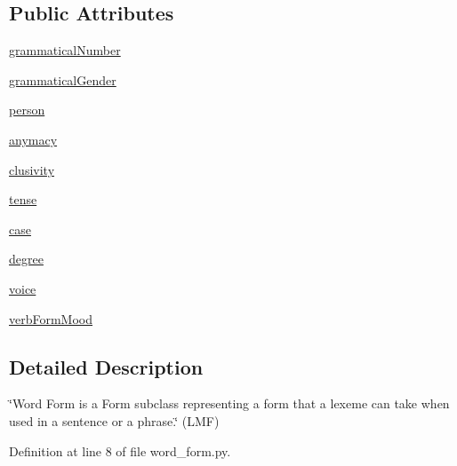 \subsection*{Public Attributes}
\begin{DoxyCompactItemize}
\item 
\hyperlink{classlmf_1_1src_1_1morphology_1_1word__form_1_1_word_form_afa022505f197952b8cf9229e065089c2}{grammatical\+Number}
\item 
\hyperlink{classlmf_1_1src_1_1morphology_1_1word__form_1_1_word_form_ab6f9abda4baef6ac9e61ef377c532279}{grammatical\+Gender}
\item 
\hyperlink{classlmf_1_1src_1_1morphology_1_1word__form_1_1_word_form_a982fc33af45a08aa5a039dc4701c3689}{person}
\item 
\hyperlink{classlmf_1_1src_1_1morphology_1_1word__form_1_1_word_form_aaf6096a08af3e92ad3878b68d2e136d3}{anymacy}
\item 
\hyperlink{classlmf_1_1src_1_1morphology_1_1word__form_1_1_word_form_aafbd3d5422083422a4a9ee9b1379913e}{clusivity}
\item 
\hyperlink{classlmf_1_1src_1_1morphology_1_1word__form_1_1_word_form_aaf6dd6658e2e9014ea0490d0edb6cec8}{tense}
\item 
\hyperlink{classlmf_1_1src_1_1morphology_1_1word__form_1_1_word_form_ac996cb6a252a2e97aea0ba861982a640}{case}
\item 
\hyperlink{classlmf_1_1src_1_1morphology_1_1word__form_1_1_word_form_ae529bc2d6ef927ccb6da6599901dccb2}{degree}
\item 
\hyperlink{classlmf_1_1src_1_1morphology_1_1word__form_1_1_word_form_ac08b72f6837815d9d11d3cb0a36ed932}{voice}
\item 
\hyperlink{classlmf_1_1src_1_1morphology_1_1word__form_1_1_word_form_a47aea97a4bbd8cca9624b0143f639716}{verb\+Form\+Mood}
\end{DoxyCompactItemize}


\subsection{Detailed Description}
\char`\"{}\+Word Form is a Form subclass representing a form that a lexeme can take when used in a sentence or a phrase.\char`\"{} (L\+M\+F) 

Definition at line 8 of file word\+\_\+form.\+py.



